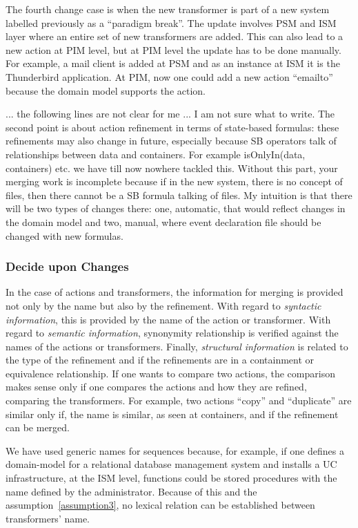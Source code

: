 \documentclass{sig-alternate}
\begin{document}
The fourth change case is when the new transformer is part of a new system labelled previously as a ``paradigm break''.
The update involves PSM and ISM layer where an entire set of new transformers are added.
This can also lead to a new action at PIM level, but at PIM level the update has to be done manually.
For example, a mail client is added at PSM and as an instance at ISM it is the Thunderbird application.
At PIM, now one could add a new action ``emailto'' because the domain model supports the action.


... the following lines are not clear for me ... 
I am not sure what to write.
The second point is about action refinement in terms of state-based formulas: 
these refinements may also change in future, especially because SB operators talk of relationships between data and containers. 
For example isOnlyIn(data, {containers}) etc. we have till now nowhere tackled this. 
Without this part, your merging work is incomplete because if in the new system, 
there is no concept of files, then there cannot be a SB formula talking of files. 
My intuition is that there will be two types of changes there: one, automatic, that would reflect changes in the domain model 
and two, manual, where event declaration file should be changed with new formulas.
 
\subsubsection{Decide upon Changes}
In the case of actions and transformers, the information for merging is provided not only by the name but also by the refinement.
With regard to \textit{syntactic information}, this is provided by the name of the action or transformer.
With regard to \textit{semantic information}, synonymity relationship is verified against the names of the actions or transformers.
Finally, \textit{structural information} is related to the type of the refinement and if the refinements are in a containment or equivalence relationship.
If one wants to compare two actions, the comparison makes sense only if 
one compares the actions and how they are refined, comparing the transformers.
For example, two actions ``copy'' and ``duplicate'' are similar only if,
the name is similar, as seen at containers, and if the refinement can be merged.

We have used generic names for sequences because, for example, 
if one defines a domain-model for a relational database management system and installs a UC infrastructure,
at the ISM level, functions could be stored procedures with the name defined by the administrator.
Because of this and the assumption~\ref{assumption3}, no lexical relation can be established between transformers' name.
\end{document}
